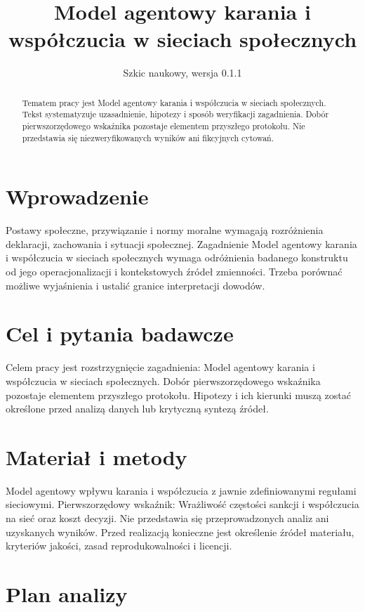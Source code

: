 \documentclass[11pt,a4paper]{article}
\title{Model agentowy karania i współczucia w sieciach społecznych}
\author{}
\date{Szkic naukowy, wersja 0.1.1}
\begin{document}
\maketitle

\begin{abstract}

Tematem pracy jest Model agentowy karania i współczucia w sieciach społecznych. Tekst systematyzuje uzasadnienie, hipotezy i sposób weryfikacji zagadnienia. Dobór pierwszorzędowego wskaźnika pozostaje elementem przyszłego protokołu. Nie przedstawia się niezweryfikowanych wyników ani fikcyjnych cytowań.

\end{abstract}

\section{Wprowadzenie}

Postawy społeczne, przywiązanie i normy moralne wymagają rozróżnienia deklaracji, zachowania i sytuacji społecznej. Zagadnienie Model agentowy karania i współczucia w sieciach społecznych wymaga odróżnienia badanego konstruktu od jego operacjonalizacji i kontekstowych źródeł zmienności. Trzeba porównać możliwe wyjaśnienia i ustalić granice interpretacji dowodów.

\section{Cel i pytania badawcze}

Celem pracy jest rozstrzygnięcie zagadnienia: Model agentowy karania i współczucia w sieciach społecznych. Dobór pierwszorzędowego wskaźnika pozostaje elementem przyszłego protokołu. Hipotezy i ich kierunki muszą zostać określone przed analizą danych lub krytyczną syntezą źródeł.

\section{Materiał i metody}

Model agentowy wpływu karania i współczucia z jawnie zdefiniowanymi regułami sieciowymi. Pierwszorzędowy wskaźnik: Wrażliwość częstości sankcji i współczucia na sieć oraz koszt decyzji. Nie przedstawia się przeprowadzonych analiz ani uzyskanych wyników. Przed realizacją konieczne jest określenie źródeł materiału, kryteriów jakości, zasad reprodukowalności i licencji.

\section{Plan analizy}
\end{document}
